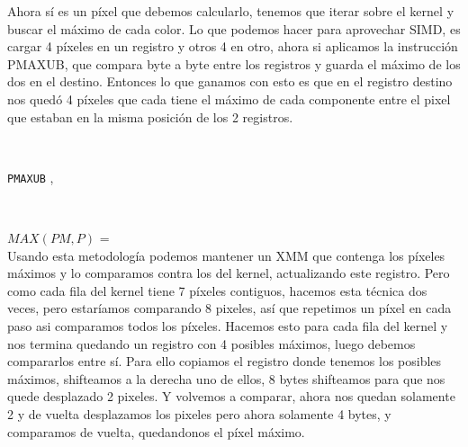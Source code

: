Ahora sí es un píxel que debemos calcularlo, tenemos que iterar sobre el kernel y buscar el máximo de cada color. Lo que podemos hacer para aprovechar SIMD, es cargar 4 píxeles en un registro y otros 4 en otro, ahora si aplicamos la instrucción PMAXUB, que compara byte a byte entre los registros y guarda el máximo de los dos en el destino. Entonces lo que ganamos con esto es que en el registro destino nos quedó 4 píxeles que cada tiene el máximo de cada componente entre el pixel que estaban en la misma posición de los 2 registros. 

\begin{center}
  \\
 

\texttt{PMAXUB} ,  \hfill

  \\
\end{center}

$MAX(PM,P)$ =  \\

Usando esta metodología podemos mantener un XMM que contenga los píxeles máximos y lo comparamos contra los del kernel, actualizando este registro. Pero como cada fila del kernel tiene 7 píxeles contiguos, hacemos esta técnica dos veces, pero estaríamos comparando 8 pixeles, así que repetimos un píxel en cada paso asi comparamos todos los píxeles. Hacemos esto para cada fila del kernel y nos termina quedando un registro con 4 posibles máximos, luego debemos compararlos entre sí. Para ello copiamos el registro donde tenemos los posibles máximos, shifteamos a la derecha uno de ellos, 8 bytes shifteamos para que nos quede desplazado 2 pixeles. Y volvemos a comparar, ahora nos quedan solamente 2 y de vuelta desplazamos los pixeles pero ahora solamente 4 bytes, y comparamos de vuelta, quedandonos el píxel máximo.

